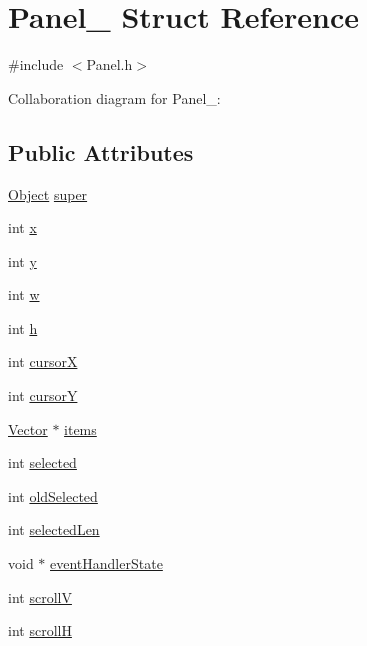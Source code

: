 \hypertarget{structPanel__}{}\section{Panel\+\_\+ Struct Reference}
\label{structPanel__}


{\ttfamily \#include $<$Panel.\+h$>$}



Collaboration diagram for Panel\+\_\+\+:
\subsection*{Public Attributes}
\begin{DoxyCompactItemize}
\item 
\hyperlink{Object_8h_a32b67ad7134cd31b5ec5ed9c6a2d3978}{Object} \hyperlink{structPanel___a2446df8affa966d54cf563e15d1b1497}{super}
\item 
int \hyperlink{structPanel___aac13fd8a2bd1346b05b32c89a7f52c4d}{x}
\item 
int \hyperlink{structPanel___a8da8fe39daf24ede79339f5710434bdd}{y}
\item 
int \hyperlink{structPanel___a48b6ee9417e7ea32ff844e48cd1cc136}{w}
\item 
int \hyperlink{structPanel___a6b2894a9017646c14729443489aeecbb}{h}
\item 
int \hyperlink{structPanel___a8e4130dc03d1c1e9be6c6eacfee33699}{cursorX}
\item 
int \hyperlink{structPanel___a856ff66f5d934d626d11c2a9f4944769}{cursorY}
\item 
\hyperlink{Vector_8h_a8297b82ce917cd21838596b7e3a7faa8}{Vector} $\ast$ \hyperlink{structPanel___a21afb578fcb302706364e14872d581e1}{items}
\item 
int \hyperlink{structPanel___a02588294b5806fb7a489f4423d795db7}{selected}
\item 
int \hyperlink{structPanel___a8de885f2ef47944b19333c8db2ad0880}{old\+Selected}
\item 
int \hyperlink{structPanel___a921966696c8903c6cad1c91baad64070}{selected\+Len}
\item 
void $\ast$ \hyperlink{structPanel___a39a6abc08affe46deb8d2765ceb068d6}{event\+Handler\+State}
\item 
int \hyperlink{structPanel___a794ea3f321b8f12f68b9024abf94d72a}{scrollV}
\item 
int \hyperlink{structPanel___ad72bdf7d0e470666db8e561a893d5518}{scrollH}
\item 

\end{DoxyCompactItemize}
